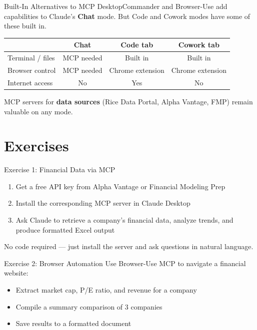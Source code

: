 \documentclass[aspectratio=169]{beamer}
\begin{document}
\begin{frame}{Built-In Alternatives to MCP}
DesktopCommander and Browser-Use add capabilities to Claude's \textbf{Chat} mode. But Code and Cowork modes have some of these built in.
\vspace{0.2cm}
\begin{center}
\small
\begin{tabular}{@{} l c c c @{}}
\toprule
& \textbf{Chat} & \textbf{Code tab} & \textbf{Cowork tab} \\
\midrule
Terminal / files & \alert{MCP needed} & Built in & Built in \\
Browser control & \alert{MCP needed} & Chrome extension & Chrome extension \\
Internet access & No & Yes & No \\
\bottomrule
\end{tabular}
\end{center}
\vspace{0.2cm}
MCP servers for \textbf{data sources} (Rice Data Portal, Alpha Vantage, FMP) remain valuable on any mode.
\end{frame}

\section{Exercises}

\begin{frame}{Exercise 1: Financial Data via MCP}
\begin{enumerate}
  \item Get a free API key from Alpha Vantage or Financial Modeling Prep
  \item Install the corresponding MCP server in Claude Desktop
  \item Ask Claude to retrieve a company's financial data, analyze trends, and produce formatted Excel output
\end{enumerate}
\vspace{0.3cm}
\alert{No code required} --- just install the server and ask questions in natural language.
\end{frame}

\begin{frame}{Exercise 2: Browser Automation}
Use Browser-Use MCP to navigate a financial website:
\begin{itemize}
  \item Extract market cap, P/E ratio, and revenue for a company
  \item Compile a summary comparison of 3 companies
  \item Save results to a formatted document
\end{itemize}
\end{frame}
\end{document}
